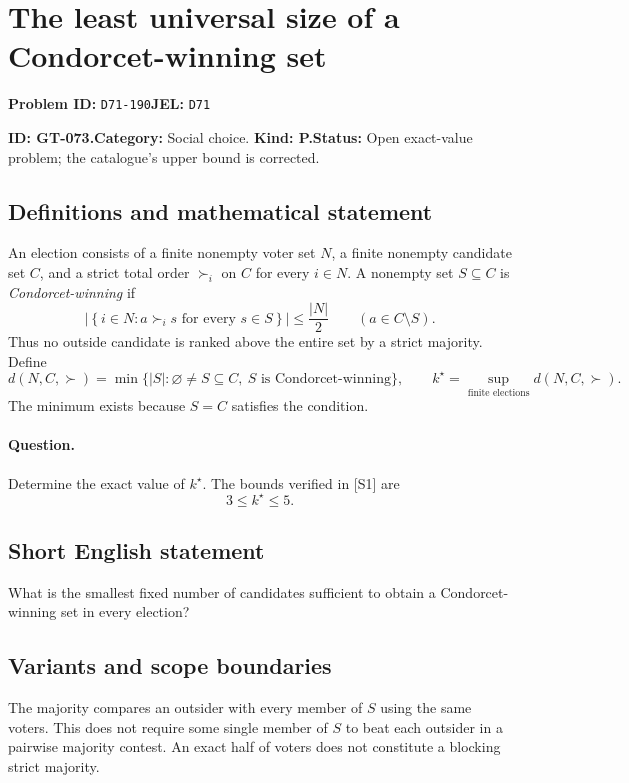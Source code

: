 \documentclass[11pt,a4paper]{article}
\begin{document}
\section*{The least universal size of a Condorcet-winning set}
\textbf{Problem ID:} \texttt{D71-190}\quad \textbf{JEL:} \texttt{D71}\par
\label{problem:OP-0203}
\label{game:GT-073}
{\sffamily\small\color{muted}
\noindent\textbf{ID: GT-073.}\quad\textbf{Category:} Social choice.
\quad\textbf{Kind: P.}\quad\textbf{Status:} Open exact-value problem;
the catalogue's upper bound is corrected.
\par}
\subsection*{Definitions and mathematical statement}
An election consists of a finite nonempty voter set \(N\), a finite
nonempty candidate set \(C\), and a strict total order \(\succ_i\) on
\(C\) for every \(i\in N\). A nonempty set \(S\subseteq C\) is
\emph{Condorcet-winning} if
\[
 \left|\left\{i\in N:
          a\succ_i s\text{ for every }s\in S\right\}\right|
 \leq \frac{|N|}{2}
 \qquad(a\in C\setminus S).
\]
Thus no outside candidate is ranked above the entire set by a strict
majority. Define
\[
 d(N,C,\succ)=
 \min\{|S|:\varnothing\ne S\subseteq C,\ S\text{ is Condorcet-winning}\},
 \qquad
 k^\star=\sup_{\text{finite elections}}d(N,C,\succ).
\]
The minimum exists because \(S=C\) satisfies the condition.

\paragraph{Question.}
Determine the exact value of \(k^\star\). The bounds verified in [S1] are
\[
                         3\leq k^\star\leq 5.
\]

\subsection*{Short English statement}
What is the smallest fixed number of candidates sufficient to obtain
a Condorcet-winning set in every election?

\subsection*{Variants and scope boundaries}
The majority compares an outsider with every member of \(S\) using the
same voters. This does not require some single member of \(S\) to beat
each outsider in a pairwise majority contest.
An exact half of voters does not constitute a blocking strict majority.
\end{document}
